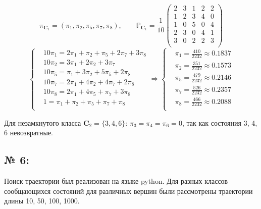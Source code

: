\documentclass[12pt]{spbstu-task}
\begin{document}
\begin{displaymath}
  \pi_{\mathbf{C}_1} = \left(\pi_1, \pi_2, \pi_5, \pi_7, \pi_8\right),\qquad
  \mathbb{P}_{\mathbf{C}_1} = \frac{1}{10}
  \begin{pmatrix}
    2 & 3 & 1 & 2 & 2 \\
    1 & 2 & 3 & 4 & 0 \\
    1 & 0 & 5 & 0 & 4 \\
    2 & 3 & 0 & 4 & 1 \\
    3 & 0 & 2 & 2 & 3 \\
  \end{pmatrix}
\end{displaymath}
\begin{displaymath}
  \left\{\begin{aligned}
    & 10\pi_1 = 2\pi_1 +  \pi_2 +  \pi_5 + 2\pi_7 + 3\pi_8 \\
    & 10\pi_2 = 3\pi_1 + 2\pi_2 + 3\pi_7 \\
    & 10\pi_5 =  \pi_1 + 3\pi_2 + 5\pi_5 + 2\pi_8 \\
    & 10\pi_7 = 2\pi_1 + 4\pi_2 + 4\pi_7 + 2\pi_8 \\
    & 10\pi_8 = 2\pi_1 + 4\pi_5 +  \pi_7 + 3\pi_8 \\
    &  1    =  \pi_1 +  \pi_2 +  \pi_5 +  \pi_7 +  \pi_8 \\
  \end{aligned}\right.\Rightarrow
  \left\{\begin{aligned}
    & \pi_1 = \frac{410}{2232} \approx 0.1837 \\
    & \pi_2 = \frac{351}{2232} \approx 0.1573 \\
    & \pi_5 = \frac{479}{2232} \approx 0.2146 \\
    & \pi_7 = \frac{526}{2232} \approx 0.2357 \\
    & \pi_8 = \frac{466}{2232} \approx 0.2088 \\
  \end{aligned}\right.
\end{displaymath}

Для незамкнутого класса \(\mathbf{C}_2 = \{3, 4, 6\}\): \(\pi_3 = \pi_4 = \pi_6 = 0\), так как
состояния 3, 4, 6 невозвратные.
\subsection*{№ 6:}
Поиск траектории был реализован на языке python. 
Для разных классов сообщающихся состояний для различных вершин были рассмотрены траектории длины
10, 50, 100, 1000.
\end{document}
